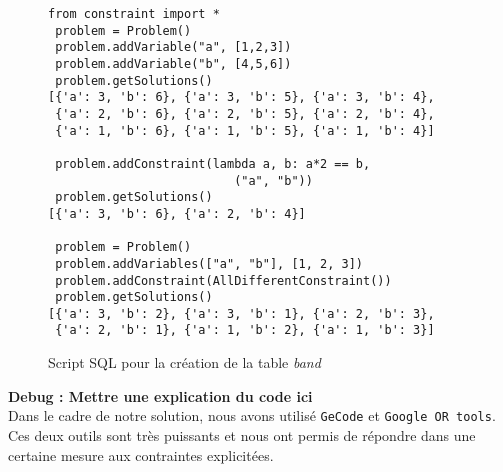 \begin{figure}[!h]
\begin{lstlisting}[frame=single]
 from constraint import *
 problem = Problem()
 problem.addVariable("a", [1,2,3])
 problem.addVariable("b", [4,5,6])
 problem.getSolutions()
[{'a': 3, 'b': 6}, {'a': 3, 'b': 5}, {'a': 3, 'b': 4},
 {'a': 2, 'b': 6}, {'a': 2, 'b': 5}, {'a': 2, 'b': 4},
 {'a': 1, 'b': 6}, {'a': 1, 'b': 5}, {'a': 1, 'b': 4}]

 problem.addConstraint(lambda a, b: a*2 == b,
                          ("a", "b"))
 problem.getSolutions()
[{'a': 3, 'b': 6}, {'a': 2, 'b': 4}]

 problem = Problem()
 problem.addVariables(["a", "b"], [1, 2, 3])
 problem.addConstraint(AllDifferentConstraint())
 problem.getSolutions()
[{'a': 3, 'b': 2}, {'a': 3, 'b': 1}, {'a': 2, 'b': 3},
 {'a': 2, 'b': 1}, {'a': 1, 'b': 2}, {'a': 1, 'b': 3}]
\end{lstlisting}
\caption{\label{sql1}Script SQL pour la création de la table \textit{band}}
\end{figure}

\textbf{Debug : Mettre une explication du code ici}\\

Dans le cadre de notre solution, nous avons utilisé \texttt{GeCode} et \texttt{Google OR tools}. Ces deux outils sont très puissants et nous ont permis de répondre dans une certaine mesure aux contraintes explicitées.

